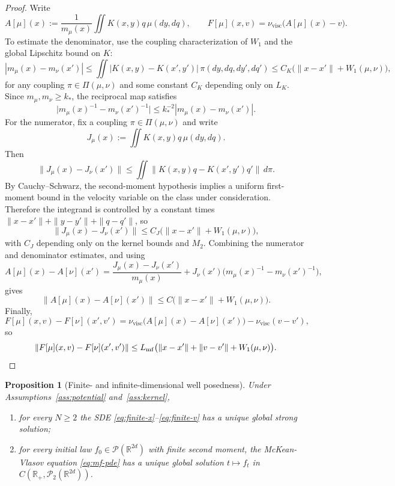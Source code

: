 \documentclass[11pt]{article}
\newtheorem{proposition}[theorem]{Proposition}
\theoremstyle{definition}
\theoremstyle{remark}
\newcommand{\R}{\mathbb{R}}
\newcommand{\mcP}{\mathcal{P}}
\begin{document}
\begin{proof}
Write
\[
A[\mu](x):=\frac{1}{m_\mu(x)}\iint K(x,y)q\,\mu(dy,dq),
\qquad
F[\mu](x,v)=\nu_{\mathrm{visc}}\bigl(A[\mu](x)-v\bigr).
\]
To estimate the denominator, use the coupling characterization of $W_1$ and the
global Lipschitz bound on $K$:
\[
|m_\mu(x)-m_\nu(x')|
\leq
\iint |K(x,y)-K(x',y')|\,\pi(dy,dq,dy',dq')
\leq
C_K\bigl(\|x-x'\|+W_1(\mu,\nu)\bigr),
\]
for any coupling $\pi\in\Pi(\mu,\nu)$ and some constant $C_K$ depending only on
$L_K$. Since $m_\mu,m_\nu\geq k_*$, the reciprocal map satisfies
\[
\bigl|m_\mu(x)^{-1}-m_\nu(x')^{-1}\bigr|
\leq
k_*^{-2}|m_\mu(x)-m_\nu(x')|.
\]
For the numerator, fix a coupling $\pi\in\Pi(\mu,\nu)$ and write
\[
J_\mu(x):=\iint K(x,y)q\,\mu(dy,dq).
\]
Then
\[
\|J_\mu(x)-J_\nu(x')\|
\leq
\iint \|K(x,y)q-K(x',y')q'\|\,d\pi.
\]
By Cauchy--Schwarz, the second-moment hypothesis implies a uniform first-moment
bound in the velocity variable on the class under consideration. Therefore the
integrand is controlled by a constant times
\(\|x-x'\|+\|y-y'\|+\|q-q'\|\), so
\[
\|J_\mu(x)-J_\nu(x')\|
\leq
C_J\bigl(\|x-x'\|+W_1(\mu,\nu)\bigr),
\]
with \(C_J\) depending only on the kernel bounds and \(M_2\). Combining the
numerator and denominator estimates,
and using
\[
A[\mu](x)-A[\nu](x')
=
\frac{J_\mu(x)-J_\nu(x')}{m_\mu(x)}
+J_\nu(x')\bigl(m_\mu(x)^{-1}-m_\nu(x')^{-1}\bigr),
\]
gives
\[
\|A[\mu](x)-A[\nu](x')\|
\leq
C\bigl(\|x-x'\|+W_1(\mu,\nu)\bigr).
\]
Finally,
\[
F[\mu](x,v)-F[\nu](x',v')
=
\nu_{\mathrm{visc}}\bigl(A[\mu](x)-A[\nu](x')\bigr)
-\nu_{\mathrm{visc}}(v-v'),
\]
so
\[
\|F[\mu](x,v)-F[\nu](x',v')\|
\leq
L_{\mathrm{mf}}\bigl(\|x-x'\|+\|v-v'\|+W_1(\mu,\nu)\bigr).
\qedhere
\]
\end{proof}

\begin{proposition}[Finite- and infinite-dimensional well posedness]\label{prop:wp}
Under Assumptions~\ref{ass:potential} and~\ref{ass:kernel},
\begin{enumerate}[label=\textnormal{(\roman*)},leftmargin=1.5em]
\item for every $N\geq2$ the SDE
\eqref{eq:finite-x}--\eqref{eq:finite-v} has a unique global strong solution;
\item for every initial law $f_0\in\mcP(\R^{2d})$ with finite second moment, the
McKean-Vlasov equation \eqref{eq:mf-pde} has a unique global solution
$t\mapsto f_t$ in $C(\R_+,\mcP_2(\R^{2d}))$.
\end{enumerate}
\end{proposition}
\end{document}
